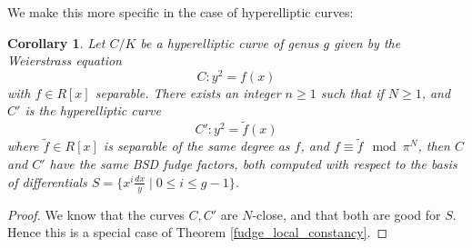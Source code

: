 \documentclass{article}
\theoremstyle{definition}
\theoremstyle{plain}
\newtheorem{cor}[defn]{Corollary}
\theoremstyle{remark}
\begin{document}
	We make this more specific in the case of hyperelliptic curves:
	\begin{cor}\label{fudge_factor_hyperelliptic}
		Let $C/K$ be a hyperelliptic curve of genus $g$ given by the Weierstrass equation
		\[C: y^2 = f(x)\]
		with $f\in R[x]$ separable. There exists an integer $n\ge 1$ such that if $N\ge 1$, and $C'$ is the hyperelliptic curve
		\[C': y^2 = \widetilde{f}(x)\]
		where $\widetilde{f}\in R[x]$ is separable of the same degree as $f$, and $f\equiv \widetilde{f} \mod \pi^N$, then $C$ and $C'$ have the same BSD fudge factors, both computed with respect to the basis of differentials $S = \{x^i\frac{dx}{y}\mid 0\le i \le g-1\}$.
	\end{cor}
	\begin{proof}
		We know that the curves $C, C'$ are $N$-close, and that both are good for $S$. Hence this is a special case of Theorem \ref{fudge_local_constancy}.
	\end{proof}
\end{document}
